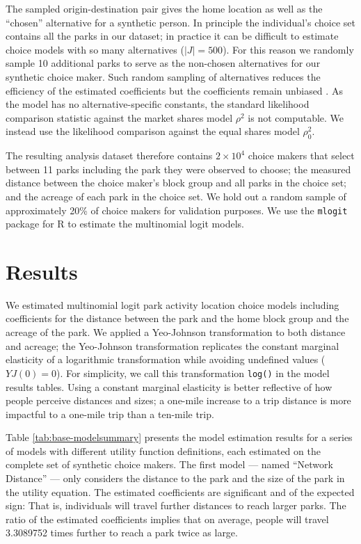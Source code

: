 \documentclass[]{elsarticle} %
\begin{document}
The sampled origin-destination pair gives the home location as well as the
``chosen'' alternative for a synthetic person. In principle the individual's
choice set contains all the parks in our dataset; in practice it can be
difficult to estimate choice models with so many alternatives
(\(|J| = 500\)). For this reason we randomly sample 10 additional parks
to serve as the non-chosen alternatives for our synthetic choice maker. Such
random sampling of alternatives reduces the efficiency of the estimated
coefficients but the coefficients remain unbiased \citep{train2009}. As the model has
no alternative-specific constants, the standard likelihood comparison statistic
against the market shares model \(\rho^2\) is not computable. We instead use the
likelihood comparison against the equal shares model \(\rho_0^2\).

The resulting analysis dataset therefore contains \ensuremath{2\times 10^{4}} choice makers that
select between 11 parks including the park they were observed to
choose; the measured distance between the choice maker's block group and all
parks in the choice set; and the acreage of each park in the choice set. We hold
out a random sample of approximately 20\% of choice makers for validation
purposes. We use the \texttt{mlogit} package for R \citep{mlogit, R} to estimate the
multinomial logit models.

\hypertarget{results}{%
\section{Results}\label{results}}

We estimated multinomial logit park activity location choice models including
coefficients for the distance between the park and the home block group and the
acreage of the park. We applied a Yeo-Johnson transformation \citep{Yeo2000} to both
distance and acreage; the Yeo-Johnson transformation replicates the constant
marginal elasticity of a logarithmic transformation while avoiding undefined
values (\(YJ(0) = 0\)). For simplicity, we call this transformation \texttt{log()} in the
model results tables. Using a constant marginal elasticity is better reflective
of how people perceive distances and sizes; a one-mile increase to a trip
distance is more impactful to a one-mile trip than a ten-mile trip.

Table \ref{tab:base-modelsummary} presents the model estimation results for a
series of models with different utility function definitions, each estimated on the
complete set of synthetic choice makers. The first model --- named ``Network
Distance'' --- only considers the distance to the park and the size of the park
in the utility equation. The estimated coefficients are significant and of the
expected sign: That is, individuals will travel further distances to reach larger
parks. The ratio of the estimated coefficients implies that on average, people
will travel 3.3089752 times further to reach a park twice as large.
\end{document}
